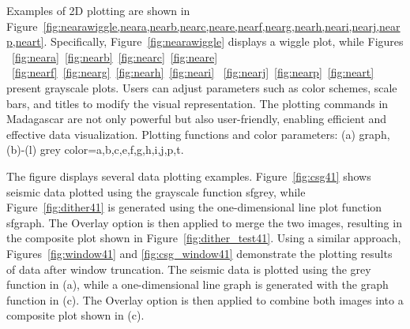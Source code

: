 Examples of 2D plotting are shown in Figure~\ref{fig:nearawiggle,neara,nearb,nearc,neare,nearf,nearg,nearh,neari,nearj,nearp,neart}. Specifically, Figure~\ref{fig:nearawiggle} displays a wiggle plot, while Figures
~\ref{fig:neara}~\ref{fig:nearb}~\ref{fig:nearc}~\ref{fig:neare}
~\ref{fig:nearf}~\ref{fig:nearg}~\ref{fig:nearh}~\ref{fig:neari}
~\ref{fig:nearj}~\ref{fig:nearp}~\ref{fig:neart} present grayscale plots. Users can adjust parameters such as color schemes, scale bars, and titles to modify the visual representation. The plotting commands in Madagascar are not only powerful but also user-friendly, enabling efficient and effective data visualization.
{Plotting functions and color parameters: (a) graph, (b)-(l) grey color=a,b,c,e,f,g,h,i,j,p,t.}

The figure displays several data plotting examples. Figure~\ref{fig:csg41} shows seismic data plotted using the grayscale function sfgrey, while Figure~\ref{fig:dither41} is generated using the one-dimensional line plot function sfgraph. The Overlay option is then applied to merge the two images, resulting in the composite plot shown in Figure~\ref{fig:dither_test41}. Using a similar approach, Figures~\ref{fig:window41} and \ref{fig:csg_window41} demonstrate the plotting results of data after window truncation.
{The seismic data is plotted using the grey function in (a), while a one-dimensional line graph is generated with the graph function in (c). The Overlay option is then applied to combine both images into a composite plot shown in (c).}

